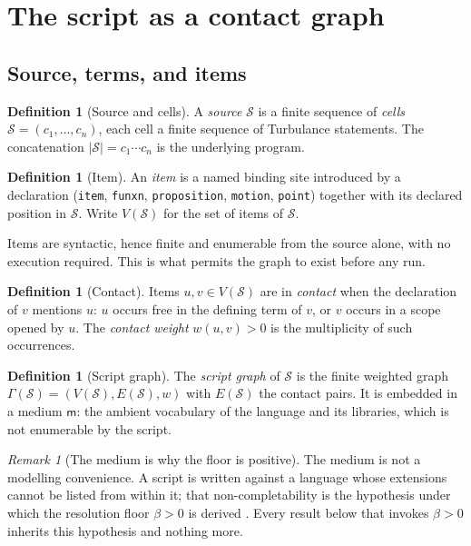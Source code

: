 \documentclass[twocolumn,11pt,a4paper]{article}
\theoremstyle{sup}
\theoremstyle{definition}
\newtheorem{definition}[theorem]{Definition}
\theoremstyle{remark}
\newtheorem{remark}[theorem]{Remark}
\newcommand{\Gph}{\Gamma}
\newcommand{\V}{V}
\newcommand{\E}{E}
\newcommand{\wt}{w}
\newcommand{\med}{\mathsf{m}}
\newcommand{\flo}{\beta}
\newcommand{\abs}[1]{\lvert#1\rvert}
\newcommand{\Src}{\mathcal{S}}
\begin{document}
\section{The script as a contact graph}
\label{sec:graph}

\subsection{Source, terms, and items}

\begin{definition}[Source and cells]
\label{def:source}
A \emph{source} $\Src$ is a finite sequence of \emph{cells}
$\Src=(c_1,\dots,c_n)$, each cell a finite sequence of Turbulance statements.
The concatenation $\abs{\Src}=c_1\cdots c_n$ is the underlying program.
\end{definition}

\begin{definition}[Item]
\label{def:item}
An \emph{item} is a named binding site introduced by a declaration
(\lstinline{item}, \lstinline{funxn}, \lstinline{proposition},
\lstinline{motion}, \lstinline{point}) together with its declared position in
$\Src$. Write $\V(\Src)$ for the set of items of $\Src$.
\end{definition}

Items are syntactic, hence finite and enumerable from the source alone, with no
execution required. This is what permits the graph to exist before any run.

\begin{definition}[Contact]
\label{def:contact}
Items $u,v\in\V(\Src)$ are in \emph{contact} when the declaration of $v$
mentions $u$: $u$ occurs free in the defining term of $v$, or $v$ occurs in a
scope opened by $u$. The \emph{contact weight} $\wt(u,v)>0$ is the
multiplicity of such occurrences.
\end{definition}

\begin{definition}[Script graph]
\label{def:script-graph}
The \emph{script graph} of $\Src$ is the finite weighted graph
$\Gph(\Src)=(\V(\Src),\E(\Src),\wt)$ with $\E(\Src)$ the contact pairs. It is
embedded in a medium $\med$: the ambient vocabulary of the language and its
libraries, which is not enumerable by the script.
\end{definition}

\begin{remark}[The medium is why the floor is positive]
\label{rem:medium}
The medium is not a modelling convenience. A script is written against a
language whose extensions cannot be listed from within it; that
non-completability is the hypothesis under which the resolution floor
$\flo>0$ is derived \citep{sachikonye2025residue}. Every result below that
invokes $\flo>0$ inherits this hypothesis and nothing more.
\end{remark}
\end{document}
